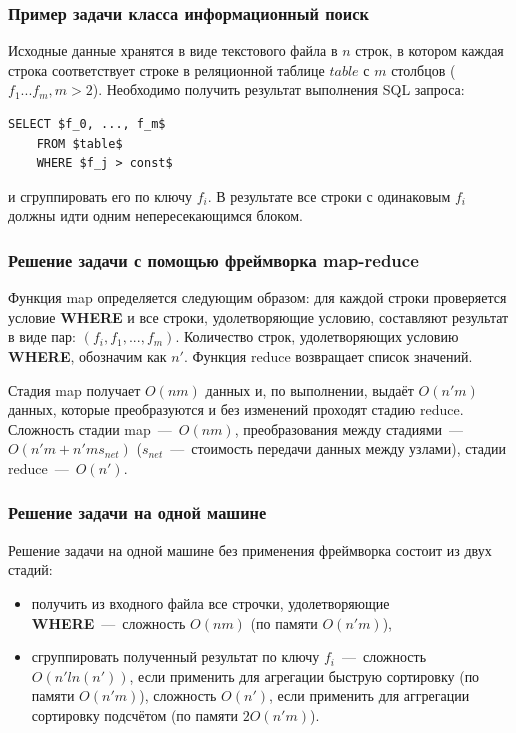 \documentclass[12pt,a4paper,oneside]{extarticle}
\begin{document}
        \subsubsection{Пример задачи класса информационный поиск}
        \label{sec:task_example}
            Исходные данные хранятся в виде текстового файла в $n$ строк, в котором каждая строка соответствует строке в реляционной таблице $table$ с $m$ столбцов ($f_1...f_m, m>2$). Необходимо получить результат выполнения SQL запроса:
            \lstset{language=SQL}
            \begin{lstlisting}[mathescape] 
    SELECT $f_0, ..., f_m$
    FROM $table$
    WHERE $f_j > const$
            \end{lstlisting}
            и сгруппировать его по ключу $f_i$. В результате все строки с одинаковым $f_i$ должны идти одним непересекающимся блоком.

        \subsubsection{Решение задачи с помощью фреймворка map-reduce}
            
            Функция map определяется следующим образом: для каждой строки проверяется условие {\bf WHERE} и все строки, удолетворяющие условию, составляют результат в виде пар: $(f_i, f_1, ..., f_m)$. Количество строк, удолетворяющих условию {\bf WHERE}, обозначим как $n'$. Функция reduce возвращает список значений.

            Стадия map получает $O(nm)$ данных и, по выполнении, выдаёт $O(n'm)$ данных, которые преобразуются и без изменений проходят стадию reduce. Сложность стадии map~---~$O(nm)$, преобразования между стадиями~---~$O(n'm+n'ms_{net})$ ($s_{net}$~---~стоимость передачи данных между узлами), стадии reduce~---~$O(n')$. 

        \subsubsection{Решение задачи на одной машине}
            Решение задачи на одной машине без применения фреймворка состоит из двух стадий: 
            \begin{itemize}
                \item получить из входного файла все строчки, удолетворяющие {\bf WHERE}~---~сложность $O(nm)$ (по памяти $O(n'm)$),
                \item сгруппировать полученный результат по ключу $f_i$~---~сложность $O(n'ln(n'))$, если применить для агрегации быструю сортировку (по памяти $O(n'm)$), сложность $O(n')$, если применить для аггрегации сортировку подсчётом (по памяти $2O(n'm)$).
            \end{itemize}
\end{document}
